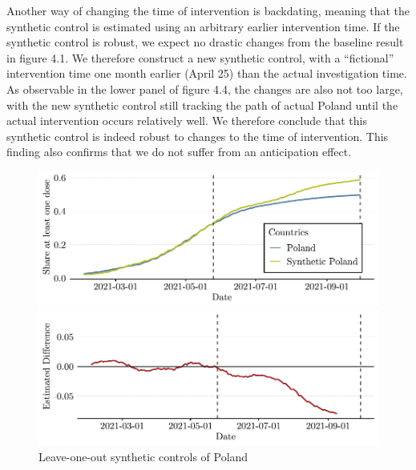 \documentclass{scrbook}
\begin{document}
Another way of changing the time of intervention is backdating, meaning
that the synthetic control is estimated using an arbitrary earlier
intervention time. If the synthetic control is robust, we expect no
drastic changes from the baseline result in figure 4.1. We therefore
construct a new synthetic control, with a ``fictional'' intervention
time one month earlier (April 25) than the actual investigation time. As
observable in the lower panel of figure 4.4, the changes are also not
too large, with the new synthetic control still tracking the path of
actual Poland until the actual intervention occurs relatively well. We
therefore conclude that this synthetic control is indeed robust to
changes to the time of intervention. This finding also confirms that we
do not suffer from an anticipation effect.

\begin{figure}[h]
\caption{Leave-one-out synthetic controls of Poland}

\begin{center}\includegraphics{bachelor_thesis_files/figure-latex/unnamed-chunk-7-1} \end{center}



\begin{center}\includegraphics{bachelor_thesis_files/figure-latex/unnamed-chunk-7-2} \end{center}
\end{figure}
\end{document}
